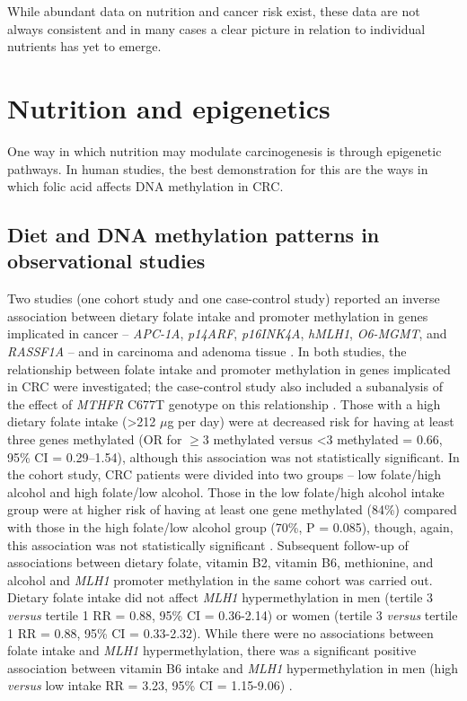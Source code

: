 \noindent While abundant data on nutrition and cancer risk exist, these data are not always consistent and in many cases a clear picture in relation to individual nutrients has yet to emerge. 
 
\section[]{Nutrition and epigenetics} %
\noindent One way in which nutrition may modulate carcinogenesis is through epigenetic pathways. In human studies, the best demonstration for this are the ways in which folic acid affects DNA methylation in CRC. 
 
\subsection{Diet and DNA methylation patterns in observational studies} %
\noindent Two studies (one cohort study and one case-control study) reported an inverse association between dietary folate intake and promoter methylation in genes implicated in cancer -- \emph{APC-1A}, \emph{p14ARF}, \emph{p16INK4A}, \emph{hMLH1}, \emph{O6-MGMT}, and \emph{RASSF1A} -- and in carcinoma and adenoma tissue \cite{c211,c235}. In both studies, the relationship between folate intake and promoter methylation in genes implicated in CRC were investigated; the case-control study also included a subanalysis of the effect of \emph{MTHFR} C677T genotype on this relationship \cite{c219}. Those with a high dietary folate intake (>212 $\mu$g per day) were at decreased risk for having at least three genes methylated (OR for $\geq$3 methylated versus <3 methylated = 0.66, 95\% CI = 0.29--1.54), although this association was not statistically significant. In the cohort study, CRC patients were divided into two groups -- low folate/high alcohol and high folate/low alcohol. Those in the low folate/high alcohol intake group were at higher risk of having at least one gene methylated (84\%) compared with those in the high folate/low alcohol group (70\%, P = 0.085), though, again, this association was not statistically significant \cite{c244}. Subsequent follow-up of associations between dietary folate, vitamin B2, vitamin B6, methionine, and alcohol and \emph{MLH1} promoter methylation in the same cohort was carried out. Dietary folate intake did not affect \emph{MLH1} hypermethylation in men (tertile 3 \emph{versus} tertile 1 RR = 0.88, 95\% CI = 0.36-2.14) or women (tertile 3 \emph{versus} tertile 1 RR = 0.88, 95\% CI = 0.33-2.32). While there were no associations between folate intake and \emph{MLH1} hypermethylation, there was a significant positive association between vitamin B6 intake and \emph{MLH1} hypermethylation in men (high \emph{versus} low intake RR = 3.23, 95\% CI = 1.15-9.06) \cite{c245}. 
 
